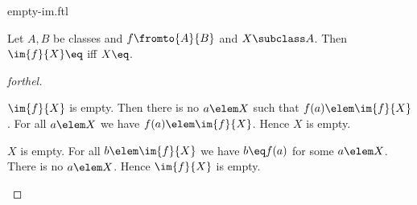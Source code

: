 \documentclass{naproche-library}
\begin{document}
\begin{smodule}[title=Empty Images]{empty-im.ftl}


\begin{proposition}[forthel,id=EmptyImProp]
  Let $A, B$ be classes and $f \fromto{A}{B}$ and $X \subclass A$.
  Then $\im{f}{X} \eq \empty$ iff $X \eq \empty$.
\end{proposition}
\begin{proof}[forthel]
  \begin{case}{$\im{f}{X}$ is empty.}
    Then there is no $a \elem X$ such that $f(a) \elem \im{f}{X}$.
    For all $a \elem X$ we have $f(a) \elem \im{f}{X}$.
    Hence $X$ is empty.
  \end{case}

  \begin{case}{$X$ is empty.}
    For all $b \elem \im{f}{X}$ we have $b \eq f(a)$ for some $a \elem X$.
    There is no $a \elem X$.
    Hence $\im{f}{X}$ is empty.
  \end{case}
\end{proof}

\end{smodule}
\end{document}
